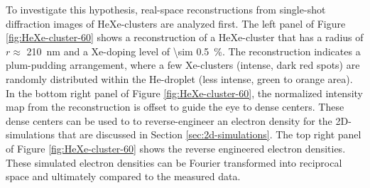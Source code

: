 %
To investigate this hypothesis, real-space reconstructions from single-shot diffraction images of HeXe-clusters are analyzed first. The left panel of Figure \ref{fig:HeXe-cluster-60} shows a reconstruction of a HeXe-cluster that has a radius of $r\approx$ \SI{210}{\nano\meter} and a Xe-doping level of \SI{\sim 0.5}{\percent}. The reconstruction indicates a plum-pudding arrangement, where a few Xe-clusters (intense, dark red spots) are randomly distributed within the He-droplet (less intense, green to orange area). In the bottom right panel of Figure \ref{fig:HeXe-cluster-60}, the normalized intensity map from the reconstruction is offset to guide the eye to dense centers. These dense centers can be used to to reverse-engineer an electron density for the 2D-simulations that are discussed in Section \ref{sec:2d-simulations}. The top right panel of Figure \ref{fig:HeXe-cluster-60} shows the reverse engineered electron densities. These simulated electron densities can be Fourier transformed into reciprocal space and ultimately compared to the measured data.\\[1\baselineskip]
%

